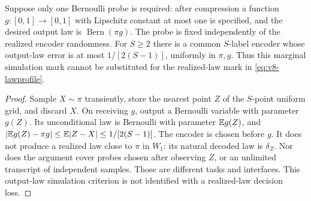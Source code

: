 \begin{proposition}
\label{prop:v8-probe}
Suppose only one Bernoulli probe is required: after compression a
function $g:[0,1]\to[0,1]$ with Lipschitz constant at most one is
specified, and the desired output law is $\operatorname{Bern}(\pi g)$.
The probe is fixed independently of the realized encoder randomness.
For $S\ge2$ there is a common $S$-label encoder whose output-law error
is at most $1/[2(S-1)]$, uniformly in $\pi,g$. Thus this marginal
simulation mark cannot be substituted for the realized-law mark in
\eqref{eq:v8-lawprofile}.
\end{proposition}
\begin{proof}
Sample $X\sim\pi$ transiently, store the nearest point $Z$ of the
$S$-point uniform grid, and discard $X$. On receiving $g$, output a
Bernoulli variable with parameter $g(Z)$. Its unconditional law is
Bernoulli with parameter $\mathbb E g(Z)$, and
$|\mathbb E g(Z)-\pi g|\le\mathbb E|Z-X|\le1/[2(S-1)]$.
The encoder is chosen before $g$. It does not produce a realized law
close to $\pi$ in $W_1$: its natural decoded law is $\delta_Z$.
Nor does the argument cover probes chosen after observing $Z$, or an
unlimited transcript of independent samples. Those are different tasks
and interfaces. This output-law simulation criterion is not identified
with a realized-law decision loss.
\end{proof}
